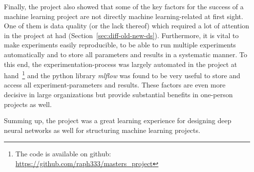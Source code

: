 Finally, the project also showed that some of the key factors for the success of a machine learning project are not directly machine learning-related at first sight. One of them is data quality (or the lack thereof) which required a lot of attention in the project at had (Section~\ref{sec:diff-old-new-ds}). Furthermore, it is vital to make experiments easily reproducible, to be able to run multiple experiments automatically and to store all parameters and results in a systematic manner. To this end, the experimentation-process was largely automated in the project at hand~\footnote{The code is available on github: \url{https://github.com/raph333/masters_project}} and the python library \textit{mlflow} was found to be very useful to store and access all experiment-parameters and results. These factors are even more decisive in large organizations but provide substantial benefits in one-person projects as well.

Summing up, the project was a great learning experience for designing deep neural networks as well for structuring machine learning projects.